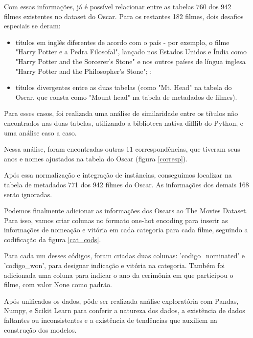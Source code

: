         Com essas informações, já é possível relacionar entre as tabelas 760 dos 942 filmes existentes no dataset do Oscar. Para os restantes 182 filmes, dois desafios especiais se deram:\par

        \begin{itemize}
            \item títulos em inglês diferentes de acordo com o país - por exemplo, o filme "Harry Potter e a Pedra Filosofal", lançado nos Estados Unidos e Índia como "Harry Potter and the Sorcerer's Stone" e nos outros países de língua inglesa "Harry Potter and the Philosopher's Stone"; \cite{yahoo2000};\par
            \item títulos divergentes entre as duas tabelas (como "Mt. Head" na tabela do Oscar, que consta como "Mount head" na tabela de metadados de filmes).\par
        \end{itemize}

        Para esses casos, foi realizada uma análise de similaridade entre os títulos não encontrados nas duas tabelas, utilizando a biblioteca nativa difflib do Python, e uma análise caso a caso.

        Nessa análise, foram encontradas outras 11 correspondências, que tiveram seus anos e nomes ajustados na tabela do Oscar (figura \ref{corresp}).

        Após essa normalização e integração de instâncias, conseguimos localizar na tabela de metadados 771 dos 942 filmes do Oscar. As informações dos demais 168 serão ignoradas.

        Podemos finalmente adicionar as informações dos Oscars ao The Movies Dataset. Para isso, vamos criar colunas no formato one-hot encoding para inserir as informações de nomeação e vitória em cada categoria para cada filme, seguindo a codificação da figura \ref{cat_cods}.

        Para cada um desses códigos, foram criadas duas colunas: '{codigo}\_nominated' e '{codigo}\_won', para designar indicação e vitória na categoria. Também foi adicionada uma coluna para indicar o ano da cerimônia em que participou o filme, com valor None como padrão.

        Após unificados os dados, pôde ser realizada análise exploratória com Pandas, Numpy, e Scikit Learn para conferir a natureza dos dados, a existência de dados faltantes ou inconsistentes e a existência de tendências que auxiliem na construção dos modelos.

